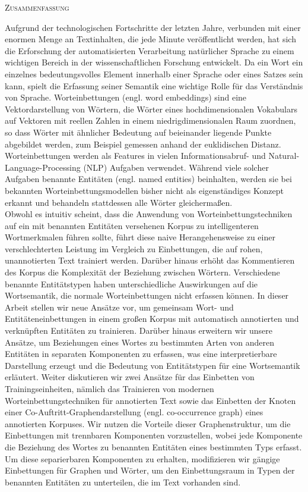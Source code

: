\begin{center}
  \textsc{Zusammenfassung}
\end{center}
%
\noindent
Aufgrund der technologischen Fortschritte der letzten Jahre, verbunden mit einer enormen Menge an Textinhalten, die jede Minute veröffentlicht werden, hat sich die  Erforschung der automatisierten Verarbeitung natürlicher Sprache zu einem wichtigen Bereich in der wissenschaftlichen Forschung entwickelt. Da ein Wort ein einzelnes bedeutungsvolles Element innerhalb einer Sprache oder eines Satzes sein kann, spielt die Erfassung seiner Semantik eine wichtige Rolle für das Verständnis von Sprache.
Worteinbettungen (engl. word embeddings) sind eine Vektordarstellung von Wörtern, die Wörter eines hochdimensionalen Vokabulars auf Vektoren mit reellen Zahlen in einem niedrigdimensionalen Raum zuordnen, so dass Wörter mit ähnlicher Bedeutung auf beieinander liegende Punkte abgebildet werden, zum Beispiel gemessen anhand der euklidischen Distanz. Worteinbettungen werden als Features in vielen Informationsabruf- und Natural-Language-Processing (NLP) Aufgaben verwendet. Während viele solcher Aufgaben benannte Entitäten (engl. named entities) beinhalten, werden sie bei bekannten Worteinbettungsmodellen bisher nicht als eigenständiges Konzept erkannt und behandeln stattdessen alle Wörter gleichermaßen.\\
Obwohl es intuitiv scheint, dass die Anwendung von Worteinbettungstechniken auf ein mit benannten Entitäten versehenen Korpus zu intelligenteren Wortmerkmalen führen sollte, führt diese naive Herangehensweise zu einer verschlechterten Leistung im Vergleich zu Einbettungen, die auf rohen, unannotierten Text trainiert werden.
Darüber hinaus erhöht das Kommentieren des Korpus die Komplexität der Beziehung zwischen Wörtern. Verschiedene benannte Entitätstypen haben unterschiedliche Auswirkungen auf die Wortsemantik, die normale Worteinbettungen nicht erfassen können.
In dieser Arbeit stellen wir neue Ansätze vor, um gemeinsam Wort- und Entitäteneinbettungen in einem großen Korpus mit automatisch annotierten und verknüpften Entitäten zu trainieren.
Darüber hinaus erweitern wir unsere Ansätze, um Beziehungen eines Wortes zu bestimmten Arten von anderen Entitäten in separaten Komponenten zu erfassen, was eine interpretierbare Darstellung erzeugt und die Bedeutung von Entitätstypen für eine Wortsemantik erläutert. Weiter diskutieren wir zwei Ansätze für das Einbetten von Trainingseinheiten, nämlich das Trainieren von modernen Worteinbettungstechniken für annotierten Text sowie das Einbetten der Knoten einer Co-Auftritt-Graphendarstellung (engl. co-occurrence graph) eines annotierten Korpuses. Wir nutzen die Vorteile dieser Graphenstruktur, um die Einbettungen mit trennbaren Komponenten vorzustellen, wobei jede Komponente die Beziehung des Wortes zu benannten Entitäten eines bestimmten Typs erfasst. Um diese separierbaren Komponenten zu erhalten, modifizieren wir gängige Einbettungen für Graphen und Wörter, um den Einbettungsraum in Typen der benannten Entitäten zu unterteilen, die im Text vorhanden sind.\\
